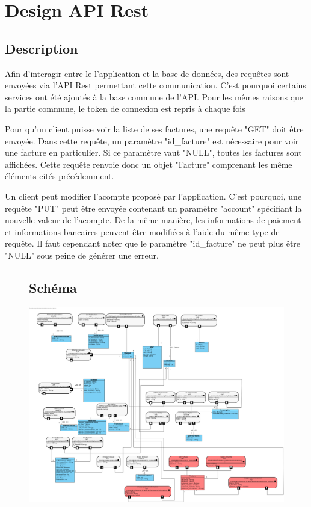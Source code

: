 \section{Design API Rest}
\subsection{Description}

\begin{flushleft}
Afin d'interagir entre le l'application et la base de données, des requêtes sont envoyées via l'API Rest permettant cette communication. C'est pourquoi certains services ont été ajoutés à la base commune de l'API.
Pour les mêmes raisons que la partie commune, le token de connexion est repris à chaque fois
\end{flushleft}

\begin{flushleft}
Pour qu'un client puisse voir la liste de ses factures, une requête "GET" doit être envoyée. Dans cette requête, un paramètre "id_facture" est nécessaire pour voir une facture en particulier. Si ce paramètre vaut "NULL", toutes les factures sont affichées.
Cette requête renvoie donc un objet "Facture" comprenant les même éléments cités précédemment.
\end{flushleft}

\begin{flushleft}
Un client peut modifier l'acompte proposé par l'application. C'est pourquoi, une requête "PUT" peut être envoyée contenant un paramètre "account" spécifiant la nouvelle valeur de l'acompte.
De la même manière, les informations de paiement et informations bancaires peuvent être modifiées à l'aide du même type de requête.
Il faut cependant noter que le paramètre "id_facture" ne peut plus être "NULL" sous peine de générer une erreur.
\end{flushleft}

\begin{figure}[h]
\subsection{Schéma}
\centering
\includegraphics[width = 1\textwidth]{extension-maxime/apirest/img/apirest-extension.png}
\end{figure}
